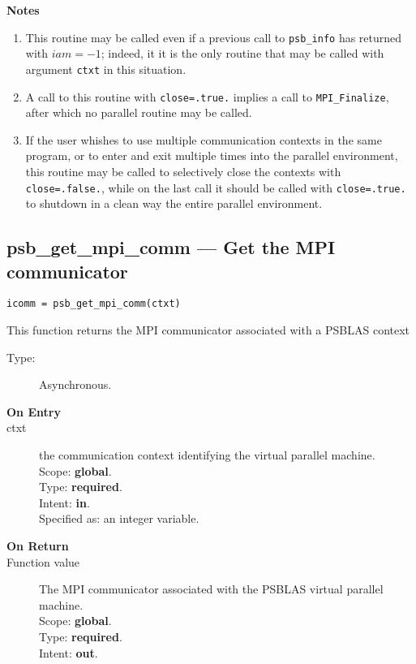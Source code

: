 {\par\noindent\large\bfseries Notes}
\begin{enumerate}
\item This routine may be called even if a previous call to
  \verb|psb_info| has returned with $iam=-1$; indeed, it it is the only
  routine that may be called with argument \verb|ctxt| in this
  situation.
\item A call to this routine with \verb|close=.true.| implies a call
  to \verb|MPI_Finalize|, after which no parallel routine may be called.
\item If the user whishes to use multiple communication contexts in the
  same program, or to enter and exit multiple times into the parallel
  environment, this routine may be called to 
  selectively close the contexts with \verb|close=.false.|, while on
  the last call it should be called with \verb|close=.true.| to
  shutdown in a clean way the entire parallel environment.
\end{enumerate}


\clearpage\subsection{psb\_get\_mpi\_comm --- Get the MPI communicator}

\begin{verbatim}
icomm = psb_get_mpi_comm(ctxt)
\end{verbatim}

This function returns the MPI communicator associated with a PSBLAS context
\begin{description}
\item[Type:] Asynchronous.
\item[\bf  On Entry ]
\item[ctxt] the communication context identifying the virtual
  parallel machine.\\
Scope: {\bf global}.\\
Type: {\bf required}.\\
Intent: {\bf in}.\\
Specified as: an integer variable.
\end{description}

\begin{description}
\item[\bf On Return]
\item[Function value] The MPI communicator associated with the  PSBLAS virtual parallel machine.\\
Scope: {\bf global}.\\
Type: {\bf required}.\\
Intent: {\bf out}.\\
\end{description}

